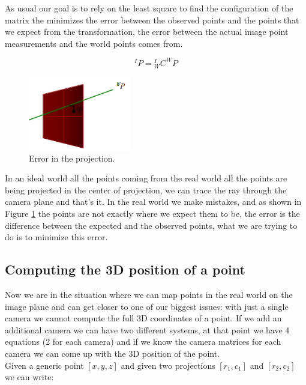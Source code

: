 As usual our goal is to rely on the least square to find the configuration of the matrix the minimizes the error between the observed points and the points that we expect from the transformation, the error between the actual image point measurements and the world points comes from.

\[
    {}^IP={}^I_WC^WP  
\]


\begin{figure}[H]
    \centering
    \includegraphics[width=0.4\textwidth]{Figures/proj.png}
    \caption{Error in the projection.}
    \label{fig:proj}
\end{figure}

In an ideal world all the points coming from the real world all the points are being projected in the center of projection, we can trace  the ray through the camera plane and that's it. In the real world we make mistakes, and as shown in Figure \ref{fig:proj} the points are not exactly where we expect them to be, the error is the difference between the expected and the observed points, what we are trying to do is to minimize this error.

\subsection{Computing the 3D position of a point}

Now we are in the situation where we can map points in the real world on the image plane and can get closer to one of our biggest issues: with just a single camera we cannot compute the full 3D coordinates of a point. If we add an additional camera we can have two different systems, at that point we have 4 equations (2 for each camera) and if we know the camera matrices for each camera we can come up with the 3D position of the point.
\\
Given a generic point \([x, y, z] \) and given two projections \([r_1, c_1]\) and \([r_2, c_2]\) we can write:

